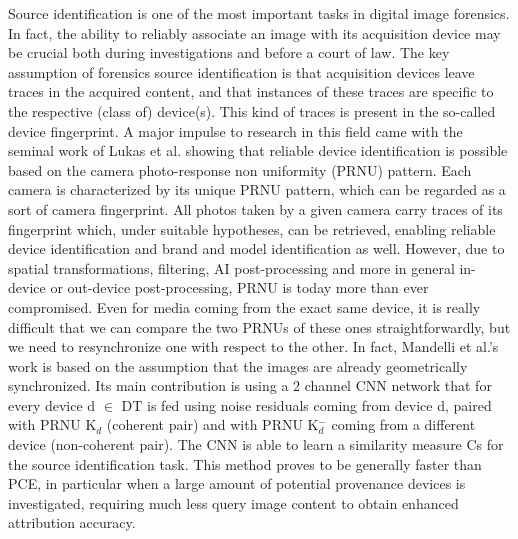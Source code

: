 Source identification is one of the most important tasks in digital image forensics. 
In fact, the ability to reliably associate an image with its acquisition device may be crucial both during investigations and before a court of law.
The key assumption of forensics source identification is that acquisition devices leave traces in the acquired content, and that instances of these traces are specific to the respective (class of) device(s). 
This kind of traces is present in the so-called device fingerprint.
A major impulse to research in this field came with the seminal work of Lukas et al. showing that reliable device identification is possible based on the camera photo-response non uniformity (PRNU) pattern. 
Each camera is characterized by its unique PRNU pattern, which can be regarded as a sort of camera fingerprint.
All photos taken by a given camera carry traces of its fingerprint which, under suitable hypotheses, can be retrieved, enabling reliable device identification and brand and model identification as well.
However, due to spatial transformations, filtering, AI post-processing and more in general in-device or out-device post-processing, PRNU is today more than ever compromised. 
Even for media coming from the exact same device, it is really difficult that we can compare the two PRNUs of these ones straightforwardly, but we need to resynchronize one with respect to the other.
In fact, Mandelli et al.'s work is based on the assumption that the images are already geometrically synchronized.
Its main contribution is using a 2 channel CNN network that for every device d $\in$ DT is fed using noise residuals coming from device d, paired with PRNU K$_{d}$ (coherent pair) and with PRNU K$_{d}^{-}$ coming from a different device (non-coherent pair). 
The CNN is able to learn a similarity measure Cs for the source identification task.
This method proves to be generally faster than PCE, in particular when a large amount of potential provenance devices is investigated, requiring much less query image content to obtain enhanced attribution accuracy.
